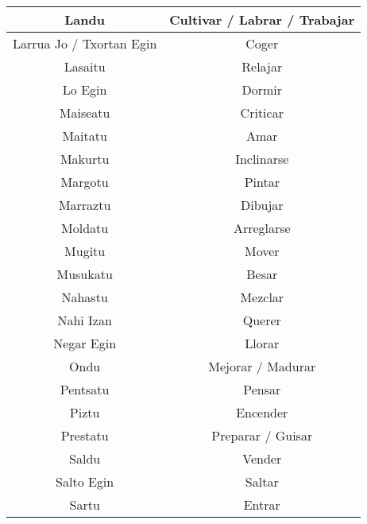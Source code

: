 \documentclass[11pt, a4paper]{article}
\begin{document}
\begin{longtable}{cc}
    \hline
    Landu                         & Cultivar / Labrar / Trabajar   \\
    \hline
    Larrua Jo / Txortan Egin      & Coger                          \\
    \hline
    Lasaitu                       & Relajar                        \\
    \hline
    Lo Egin                       & Dormir                         \\
    \hline
    Maiseatu                      & Criticar                       \\
    \hline
    Maitatu                       & Amar                           \\
    \hline
    Makurtu                       & Inclinarse                     \\
    \hline
    Margotu                       & Pintar                         \\
    \hline
    Marraztu                      & Dibujar                        \\
    \hline
    Moldatu                       & Arreglarse                     \\
    \hline
    Mugitu                        & Mover                          \\
    \hline
    Musukatu                      & Besar                          \\
    \hline
    Nahastu                       & Mezclar                        \\
    \hline
    Nahi Izan                     & Querer                         \\
    \hline
    Negar Egin                    & Llorar                         \\
    \hline
    Ondu                          & Mejorar / Madurar              \\
    \hline
    Pentsatu                      & Pensar                         \\
    \hline
    Piztu                         & Encender                       \\
    \hline
    Prestatu                      & Preparar / Guisar              \\
    \hline
    Saldu                         & Vender                         \\
    \hline
    Salto Egin                    & Saltar                         \\
    \hline
    Sartu                         & Entrar                         \\

\end{longtable}
\end{document}
